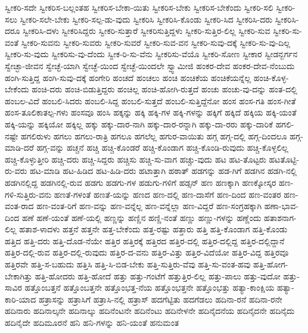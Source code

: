 {ಸ್ವೀಕರಿ-ಸದೇ
ಸ್ವೀಕರಿಸ-ಬಲ್ಲಂತಹ
ಸ್ವೀಕರಿಸ-ಬೇಕಾ-ಯಿತು
ಸ್ವೀಕರಿಸ-ಬೇಕು
ಸ್ವೀಕರಿಸ-ಬೇಕೆಂದು
ಸ್ವೀಕರಿ-ಸಲಿ
ಸ್ವೀಕರಿ-ಸಲು
ಸ್ವೀಕರಿ-ಸಲೇ-ಬೇಕು
ಸ್ವೀಕರಿ-ಸಲ್ಪ-ಡು-ವುದು
ಸ್ವೀಕರಿಸಿ
ಸ್ವೀಕರಿಸಿ-ಕೊಂಡು
ಸ್ವೀಕರಿ-ಸಿದ
ಸ್ವೀಕರಿಸಿ-ದರು
ಸ್ವೀಕರಿಸಿ-ದರೂ
ಸ್ವೀಕರಿಸಿ-ದಳು
ಸ್ವೀಕರಿಸಿದ್ದರು
ಸ್ವೀಕರಿ-ಸುತ್ತಾರೆ
ಸ್ವೀಕರಿಸುತ್ತಿದ್ದಳು
ಸ್ವೀಕರಿ-ಸುತ್ತಿರ-ಲಿಲ್ಲ
ಸ್ವೀಕರಿ-ಸುವ
ಸ್ವೀಕರಿ-ಸು-ವಂತೆ
ಸ್ವೀಕರಿ-ಸುವನು
ಸ್ವೀಕರಿ-ಸುವರು
ಸ್ವೀಕರಿ-ಸುವರೆ
ಸ್ವೀಕರಿ-ಸುವ-ವನ
ಸ್ವೀಕರಿ-ಸುವು-ದಕ್ಕೆ
ಸ್ವೀಕರಿ-ಸು-ವು-ದಿಲ್ಲ
ಸ್ವೀಕರಿ-ಸು-ವುದು
ಸ್ವೀಕರಿಸು-ವು-ದೆಂದು
ಸ್ವೀಕ-ರಿ-ಸು-ವೆನು
ಸ್ವೀಕರಿಸು-ವೆಯೊ
ಸ್ವೀಕರಿ-ಸೋಣ
ಸ್ವೀಕಾರ
ಸ್ವೀಡನ್ಬರ್ಗನ
ಸ್ವೇಚ್ಛಾ-ಜೀವನ
ಸ್ವೇಚ್ಛೆ-ಯಾಗಿ
ಸ್ವೇಚ್ಛೆ-ಯಿಂದ
ಸ್ವೇಚ್ಛೆ-ಯಿಂದಲೇ
ಸ್ವ್ವಾಮೀಜಿ
ಹಂಕರ-ದೇವ
ಹಂಕರ-ದೇವ-ನೆಂಬುದು
ಹಂಗಿ-ಸುತ್ತಿದ್ದ
ಹಂಗಿ-ಸುವು-ದಕ್ಕೆ
ಹಂಗೇರಿ
ಹಂಚದೆ
ಹಂಚಲು
ಹಂಚಿ
ಹಂಚಿಕೆಯ
ಹಂಚಿಕೆಯನ್ನೆಲ್ಲ
ಹಂಚಿ-ಕೊಳ್ಳ-ಬೇಕೆಂದು
ಹಂಚಿ-ದರು
ಹಂಚಿ-ಬಿಡುತ್ತಿದ್ದರು
ಹಂಚಿಲ್ಲ
ಹಂಚಿ-ಹೋಗಿ-ರುತ್ತದೆ
ಹಂಚು
ಹಂಚು-ವು-ದನ್ನು
ಹಂತ-ದಲ್ಲಿ
ಹಂಬಲ-ವಿದೆ
ಹಂಬಲಿ-ಸಿದರು
ಹಂಬಲಿ-ಸಿದ್ದ
ಹಂಬಲಿ-ಸುತ್ತದೆ
ಹಂಬಲಿ-ಸುತ್ತಿದ್ದೆನೋ
ಹಂಸ
ಹಂಸ-ಗತಿ
ಹಂಸ-ಗೀತೆ
ಹಂಸ-ತೂಲಿಕಾತಲ್ಪ-ಗಳು
ಹಂಸವೂ
ಹಂಸಿ
ಹಕ್ಕನ್ನು
ಹಕ್ಕಿ
ಹಕ್ಕಿ-ಗಳ
ಹಕ್ಕಿ-ಗಳನ್ನು
ಹಕ್ಕಿಗೆ
ಹಕ್ಕಿದೆ
ಹಕ್ಕಿಯ
ಹಕ್ಕಿ-ಯಂತೆ
ಹಕ್ಕಿ-ಯನ್ನು
ಹಕ್ಕಿಯೋ
ಹಕ್ಕಿಲ್ಲ
ಹಕ್ಕು
ಹಕ್ಕು-ದಾರ-ನಾಗಿ
ಹಕ್ಕು-ದಾರ-ರನ್ನಾಗಿ
ಹಕ್ಕು-ದಾ-ರರು
ಹಕ್ಕು-ದಾರಿಕೆ
ಹಗಲಿ-ನಷ್ಟೇ
ಹಗಲಿರುಳು
ಹಗಲು
ಹಗಲು-ರಾತ್ರಿ
ಹಗಲೂ
ಹಗಲೆಲ್ಲ
ಹಗುರ-ವಾಯಿತು
ಹಗ್ಗ
ಹಗ್ಗ-ದಲ್ಲಿ
ಹಗ್ಗ-ದಿಂದಲೂ
ಹಗ್ಗ-ಮಾಡಿ-ದರೆ
ಹಗ್ಗ-ವನ್ನು
ಹಚ್ಚನೆ
ಹಚ್ಚಿ
ಹಚ್ಚಿ-ಕೊಂಡರೆ
ಹಚ್ಚಿ-ಕೊಂಡಾಗ
ಹಚ್ಚಿ-ಕೊಂಡಿ-ರುವುದು
ಹಚ್ಚಿ-ಕೊಳ್ಳಲಿಲ್ಲ
ಹಚ್ಚಿ-ಕೊಳ್ಳುತ್ತೀರಿ
ಹಚ್ಚಿ-ದರು
ಹಚ್ಚಿ-ಸಿದ್ದರು
ಹಚ್ಚಿಸು
ಹಚ್ಚಿ-ಸು-ವಾಗ
ಹಚ್ಚು-ವುದು
ಹಟ
ಹಟ-ತೊಟ್ಟರು
ಹಟತೊಟ್ಟಿ-ರು-ವರು
ಹಟ-ಮಾಡಿ
ಹಟ-ಹಿಡಿದ
ಹಟ-ಹಿಡಿ-ದರು
ಹಟಾತ್ತಾಗಿ
ಹಠಾತ್
ಹಡಗನ್ನು
ಹಡ-ಗಿಗೆ
ಹಡಗಿನ
ಹಡಗಿ-ನಲ್ಲಿ
ಹಡಗಿನಲ್ಲಿದ್ದ
ಹಡಗಿನಲ್ಲಿ-ರುವ
ಹಡಗು
ಹಡಗು-ಗಳ
ಹಡುಗು-ಗಳಿಗೆ
ಹಡ್ಸನ್
ಹಣ
ಹಣಕ್ಕಾಗಿ
ಹಣಕ್ಕೋಸ್ಕರ
ಹಣ-ಗಳಿ-ಸುತ್ತಿರು-ವನು
ಹಣತೆ-ಗಳಂತೆ
ಹಣತೆ-ಯನ್ನು
ಹಣದ
ಹಣ-ದಲ್ಲಿ
ಹಣ-ದಾಸೆಗೆ
ಹಣ-ದಿಂದ
ಹಣ-ವಂತರ
ಹಣ-ವಂತ-ರಾದ
ಹಣ-ವಂತ-ರಿಗೆ
ಹಣ-ವನ್ನು
ಹಣ-ವನ್ನೆಲ್ಲ
ಹಣ-ವನ್ನೆಲ್ಲಾ
ಹಣ-ವಿದ್ದರೆ
ಹಣ-ಸಂಗ್ರಹಕ್ಕಾಗಿ
ಹಣಾ-ಭಾವ-ದಿಂದ
ಹಣೆ
ಹಣೆ-ಯಂತೆ
ಹಣೆ-ಯಲ್ಲಿ
ಹಣ್ಣನ್ನು
ಹಣ್ಣಿನ
ಹಣ್ಣಿ-ನಂತೆ
ಹಣ್ಣು
ಹಣ್ಣು-ಗಳನ್ನು
ಹಣ್ಣೆಂದು
ಹತಾಶನಾಗ-ಲಿಲ್ಲ
ಹತಾಶ-ಳಾದಳು
ಹತ್ತನೆ
ಹತ್ತನೇ
ಹತ್ತ-ಬೇಕೆಂದು
ಹತ್ತ-ರಷ್ಟು
ಹತ್ತಾರು
ಹತ್ತಿ
ಹತ್ತಿ-ಕೊಂಡಾಗ
ಹತ್ತಿ-ಕೊಂಡು
ಹತ್ತಿದ
ಹತ್ತಿ-ದರು
ಹತ್ತಿ-ದೊಡ-ನೆಯೇ
ಹತ್ತಿರ
ಹತ್ತಿರಕ್ಕೆ
ಹತ್ತಿರದ
ಹತ್ತಿರ-ದಲ್ಲಿ
ಹತ್ತಿರ-ದಲ್ಲಿದ್ದ
ಹತ್ತಿರ-ದಲ್ಲಿದ್ದಾನೆ
ಹತ್ತಿರ-ದಲ್ಲಿ-ರುವ
ಹತ್ತಿರ-ದಲ್ಲಿ-ರುವುದು
ಹತ್ತಿರ-ದ-ವನು
ಹತ್ತಿರ-ವಿತ್ತು
ಹತ್ತಿರ-ವಿದೆಯೋ
ಹತ್ತಿರ-ವಿದ್ದ
ಹತ್ತಿರವೂ
ಹತ್ತಿರವೇ
ಹತ್ತಿ-ಸ-ಬಹುದು
ಹತ್ತಿಸಿ
ಹತ್ತಿ-ಸಿ-ಬಿಡ-ಬೇಕು
ಹತ್ತಿ-ಸುತ್ತಿರು-ವೆವು
ಹತ್ತಿ-ಸು-ವಂತ-ಹವು
ಹತ್ತಿ-ಹೋಗ-ಬೇಕಾಗಿತ್ತು
ಹತ್ತಿ-ಹೋದರು
ಹತ್ತಿ-ಹೋದೆ
ಹತ್ತು
ಹತ್ತು-ಗಂಟೆಗೆ
ಹತ್ತುತ್ತಿರ-ಲಿಲ್ಲ
ಹತ್ತು-ಪಾಲು
ಹತ್ತು-ವುದೋ
ಹತ್ತು-ಸಾವಿರ
ಹತ್ತೊಂಬತ್ತನೆ
ಹತ್ತೊಂಬತ್ತನೇ
ಹತ್ತೊಂಭತ್ತ-ನೆಯ
ಹತ್ತೊಂಭತ್ತನೇ
ಹತ್ತೊಂಭತ್ತು
ಹತ್ಯಾ-ಕಾಂಕ್ಷಿಯ
ಹತ್ಯಾ-ಕಾರಿ-ಯಾದ
ಹತ್ರಾಸನ್ನು
ಹತ್ರಾಸಿಗೆ
ಹತ್ರಾಸಿ-ನಲ್ಲಿ
ಹತ್ರಾಸ್
ಹದಗೆಟ್ಟಿತು
ಹದಗೆಡಲು
ಹದಿನಾ-ರನೆ
ಹದಿನಾ-ರನೇ
ಹದಿನಾರು
ಹದಿನಾಲ್ಕನೇ
ಹದಿನಾಲ್ಕು
ಹದಿನೆಂಟನೇ
ಹದಿನೆಂಟು
ಹದಿನೇಳನೇ
ಹದಿನೈದನೆಯ
ಹದಿನೈದನೇ
ಹದಿನೈದು
ಹದಿನೈದೇ
ಹದಿಮೂರನೆ
ಹನಿ
ಹನಿ-ಗಳನ್ನು
ಹನಿ-ಯಂತೆ
ಹನುಮಂತ
}
